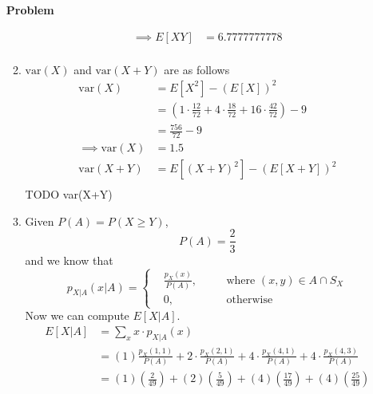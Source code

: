 \documentclass[12pt]{article}
\newenvironment{Ex}{\textbf{Problem}\vspace{.75em}\\}{}
\begin{document}
\begin{enumerate}
\begin{Ex}
\begin{solution}
\begin{enumerate}
\begin{equation}
\begin{aligned}
            \implies E[XY] &= 6.7777777778 \\
          \end{aligned}
        \end{equation}
      \item $\text{var}(X)$ and $\text{var}(X+Y)$ are as follows
        \begin{equation}
          \label{eq:2f-variances}
          \begin{aligned}
            \text{var}(X) &= E[X^2] - (E[X])^2 \\
            &=
            \left(1\cdot\frac{12}{72}+4\cdot\frac{18}{72}+16\cdot\frac{42}{72}\right)
            - 9 \\
            &= \frac{756}{72}-9 \\
            \implies \text{var}(X) &= 1.5 \\
            \text{var}(X+Y) &= E[(X+Y)^2] - (E[X+Y])^2 \\
          \end{aligned}
        \end{equation}
        {\huge TODO var(X+Y)}
      \item Given $P(A) = P(X \ge Y)$,
        \begin{equation}
          \label{eq:2g-decl}
          P(A) = \frac{2}{3}
        \end{equation}
        and we know that
        \begin{equation}
          \label{eq:2g-conditioning}
          p_{X|A}(x|A) = \left\{
            \begin{aligned}
              &\frac{p_{X}(x)}{P(A)}, && \quad\text{where } (x,y) \in
              A \cap S_{X} \\
              &0, && \quad\text{otherwise}
            \end{aligned}\right.
        \end{equation}
        Now we can compute $E[X|A]$.
        \begin{equation}
          \label{eq:2g-e-x-given-a}
          \begin{aligned}
            E[X|A] &= \sum_x x \cdot p_{X|A}(x) \\
            &= (1)\frac{p_X(1,1)}{P(A)} +
            2\cdot\frac{p_X(2,1)}{P(A)} +
            4\cdot\frac{p_X(4,1)}{P(A)} +
            4\cdot\frac{p_X(4,3)}{P(A)} \\
            &= (1)\left(\frac{2}{49}\right) +
            (2)\left(\frac{5}{49}\right) +
            (4)\left(\frac{17}{49}\right) +
            (4)\left(\frac{25}{49}\right) \\

\end{aligned}
\end{equation}
\end{enumerate}
\end{solution}
\end{Ex}
\end{enumerate}
\end{document}
